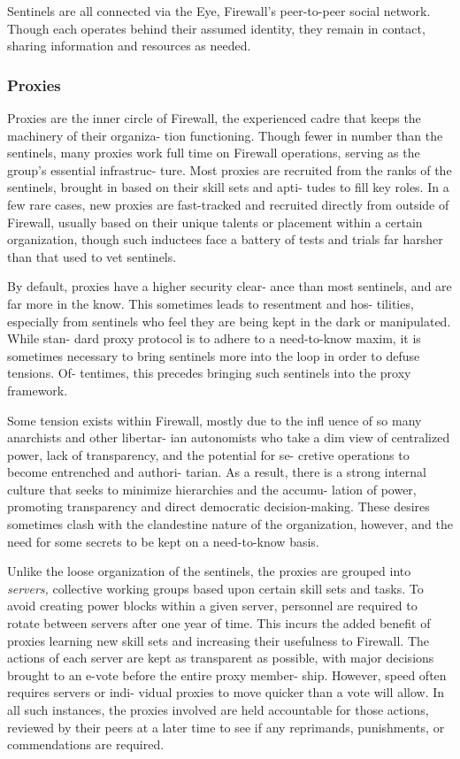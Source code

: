 Sentinels are all connected via the Eye, Firewall's 
peer-to-peer social network. Though each operates 
behind their assumed identity, they remain in contact, 
sharing information and resources as needed. 

\subsubsection{Proxies }

Proxies are the inner circle of Firewall, the experienced 
cadre that keeps the machinery of their organiza-
tion functioning. Though fewer in number than the 
sentinels, many proxies work full time on Firewall 
operations, serving as the group's essential infrastruc-
ture. Most proxies are recruited from the ranks of the 
sentinels, brought in based on their skill sets and apti-
tudes to fill key roles. In a few rare cases, new proxies 
are fast-tracked and recruited directly from outside 
of Firewall, usually based on their unique talents or 
placement within a certain organization, though such 
inductees face a battery of tests and trials far harsher 
than that used to vet sentinels.

By default, proxies have a higher security clear-
ance than most sentinels, and are far more in the 
know. This sometimes leads to resentment and hos-
tilities, especially from sentinels who feel they are 
being kept in the dark or manipulated. While stan-
dard proxy protocol is to adhere to a need-to-know 
maxim, it is sometimes necessary to bring sentinels 
more into the loop in order to defuse tensions. Of-
tentimes, this precedes bringing such sentinels into 
the proxy framework.

Some tension exists within Firewall, mostly due to 
the infl uence of so many anarchists and other libertar-
ian autonomists who take a dim view of centralized 
power, lack of transparency, and the potential for se-
cretive operations to become entrenched and authori-
tarian. As a result, there is a strong internal culture 
that seeks to minimize hierarchies and the accumu-
lation of power, promoting transparency and direct 
democratic decision-making. These desires sometimes 
clash with the clandestine nature of the organization, 
however, and the need for some secrets to be kept on 
a need-to-know basis. 

Unlike the loose organization of the sentinels, the 
proxies are grouped into \textit{servers,} collective working 
groups based upon certain skill sets and tasks. To 
avoid creating power blocks within a given server, 
personnel are required to rotate between servers 
after one year of time. This incurs the added benefit 
of proxies learning new skill sets and increasing their 
usefulness to Firewall. The actions of each server are 
kept as transparent as possible, with major decisions 
brought to an e-vote before the entire proxy member-
ship. However, speed often requires servers or indi-
vidual proxies to move quicker than a vote will allow. 
In all such instances, the proxies involved are held 
accountable for those actions, reviewed by their peers 
at a later time to see if any reprimands, punishments, 
or commendations are required.

